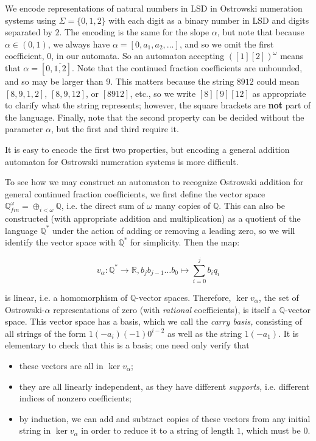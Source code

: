 We encode representations of natural numbers in LSD in Ostrowski numeration systems using $\Sigma = \{0,1,2\}$ with each digit as a binary number in LSD and digits separated by $2$.
The encoding is the same for the slope $\alpha$, but note that because $\alpha \in (0, 1)$, we always have $\alpha = [0,a_1,a_2,\ldots]$, and so we omit the first coefficient, $0$, in our automata.
So an automaton accepting $([1][2])^{\omega}$ means that $\alpha = [0,\overline{1,2}]$.
Note that the continued fraction coefficients are unbounded, and so may be larger than $9$.
This matters because the string $8912$ could mean $[8,9,1,2]$, $[8,9,12]$, or $[8912]$, etc., so we write $[8][9][12]$ as appropriate to clarify what the string represents; however, the square brackets are \textbf{not} part of the language.
Finally, note that the second property can be decided without the parameter $\alpha$, but the first and third require it.

It is easy to encode the first two properties, but encoding a general addition automaton for Ostrowski numeration systems is more difficult. 

To see how we may construct an automaton to recognize Ostrowski addition for general continued fraction coefficients, we first define the vector space $\mathbb{Q}^\omega_{fin} = \oplus_{i < \omega} \mathbb{Q}$, i.e. the direct sum of $\omega$ many copies of $\mathbb{Q}$. This can also be constructed (with appropriate addition and multiplication) as a quotient of the language $\mathbb{Q}^*$ under the action of adding or removing a leading zero, so we will identify the vector space with $\mathbb{Q}^*$ for simplicity. Then the map:

$$v_\alpha : \mathbb{Q}^* \to \mathbb{R}, b_j b_{j-1} \dots b_0 \mapsto \sum_{i=0}^j b_i q_i$$

is linear, i.e. a homomorphism of $\mathbb{Q}$-vector spaces. Therefore, $\ker v_\alpha$, the set of Ostrowski-$\alpha$ representations of zero (with \textit{rational} coefficients), is itself a $\mathbb{Q}$-vector space. This vector space has a basis, which we call the \textit{carry basis,} consisting of all strings of the form $1(-a_i)(-1)0^{i-2}$ as well as the string $1(-a_1)$. It is elementary to check that this is a basis; one need only verify that

\begin{itemize}
	\item these vectors are all in $\ker v_\alpha$;
	\item they are all linearly independent, as they have different \textit{supports,} i.e. different indices of nonzero coefficients;
	\item by induction, we can add and subtract copies of these vectors from any initial string in $\ker v_\alpha$ in order to reduce it to a string of length $1$, which must be $0$.
\end{itemize}

